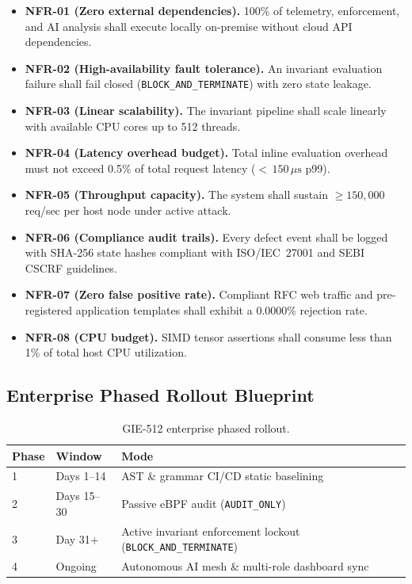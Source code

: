 \documentclass{portalciencia}
\theoremstyle{plain}
\theoremstyle{definition}
\begin{document}
\begin{itemize}
  \item \textbf{NFR-01 (Zero external dependencies).} 100\% of telemetry, enforcement, and AI analysis shall execute locally on-premise without cloud API dependencies.
  \item \textbf{NFR-02 (High-availability fault tolerance).} An invariant evaluation failure shall fail closed (\texttt{BLOCK\_AND\_TERMINATE}) with zero state leakage.
  \item \textbf{NFR-03 (Linear scalability).} The invariant pipeline shall scale linearly with available CPU cores up to 512 threads.
  \item \textbf{NFR-04 (Latency overhead budget).} Total inline evaluation overhead must not exceed 0.5\% of total request latency (${<}\,150\,\mu\mathrm{s}$ p99).
  \item \textbf{NFR-05 (Throughput capacity).} The system shall sustain $\ge 150{,}000$ req/sec per host node under active attack.
  \item \textbf{NFR-06 (Compliance audit trails).} Every defect event shall be logged with SHA-256 state hashes compliant with ISO/IEC~27001 and SEBI CSCRF guidelines.
  \item \textbf{NFR-07 (Zero false positive rate).} Compliant RFC web traffic and pre-registered application templates shall exhibit a 0.0000\% rejection rate.
  \item \textbf{NFR-08 (CPU budget).} SIMD tensor assertions shall consume less than 1\% of total host CPU utilization.
\end{itemize}

\subsection{Enterprise Phased Rollout Blueprint}

\begin{table}[ht]
\centering
\caption{GIE-512 enterprise phased rollout.}
\label{tab:rollout}
\begin{tabular}{llp{7.4cm}}
\toprule
Phase & Window & Mode \\
\midrule
1 & Days 1--14 & AST \& grammar CI/CD static baselining \\
2 & Days 15--30 & Passive eBPF audit (\texttt{AUDIT\_ONLY}) \\
3 & Day 31+ & Active invariant enforcement lockout (\texttt{BLOCK\_AND\_TERMINATE}) \\
4 & Ongoing & Autonomous AI mesh \& multi-role dashboard sync \\
\bottomrule
\end{tabular}
\end{table}
\end{document}
